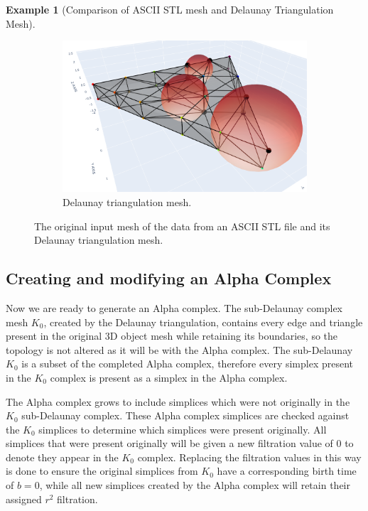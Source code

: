 \documentclass[ma]{uncgdissertationexp}
\theoremstyle{plain}
\theoremstyle{definition}
\newtheorem{example}[theorem]{Example}
\theoremstyle{remark}
\begin{document}
\begin{example}[Comparison of ASCII STL mesh and Delaunay Triangulation Mesh]
\begin{figure}[H]
\begin{subfigure}[b]{0.49\textwidth}
        \includegraphics[width=\textwidth]{Final Run, (triangular prism - triangle hole) meshpy screenshot circumsphere.png}
        \caption{Delaunay triangulation mesh.}
        \label{fig:del_circumsphere}
    \end{subfigure}
    \caption{The original input mesh of the data from an ASCII STL file and its Delaunay triangulation mesh.}
    \label{fig:delaunay_circumsphere}
\end{figure}
\end{example}

\subsection{Creating and modifying an Alpha Complex}
\label{sec:modify_alpha_complex}
\par Now we are ready to generate an Alpha complex. The sub-Delaunay complex mesh $K_{0}$, created by the Delaunay triangulation, contains every edge and triangle present in the original 3D object mesh while retaining its boundaries, so the topology is not altered as it will be with the Alpha complex. The sub-Delaunay $K_{0}$ is a subset of the completed Alpha complex, therefore every simplex present in the $K_{0}$ complex is present as a simplex in the Alpha complex.
\par The Alpha complex grows to include simplices which were not originally in the $K_{0}$ sub-Delaunay complex. These Alpha complex simplices are checked against the $K_{0}$ simplices to determine which simplices were present originally. All simplices that were present originally will be given a new filtration value of 0 to denote they appear in the $K_{0}$ complex. Replacing the filtration values in this way is done to ensure the original simplices from $K_{0}$ have a corresponding birth time of $b=0$, while all new simplices created by the Alpha complex will retain their assigned $r^{2}$ filtration.
\end{document}
